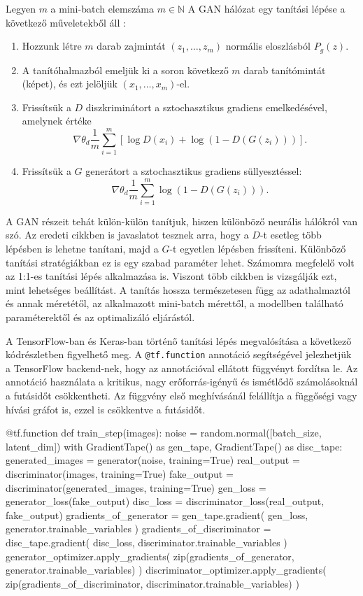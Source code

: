 Legyen $m$ a mini-batch elemszáma $m \in \mathbb{N}$
A GAN hálózat egy tanítási lépése a következő műveletekből áll \cite{goodfellow2014generative}:
\begin{enumerate}
\item Hozzunk létre $m$ darab zajmintát $(z_1, \ldots, z_m)$ normális eloszlásból $P_g(z)$.
\item A tanítóhalmazból emeljük ki a soron következő $m$ darab tanítómintát (képet), és ezt jelöljük $(x_1, \ldots, x_m)$-el. %
\item Frissítsük a $D$ diszkriminátort a sztochasztikus gradiens emelkedésével, amelynek értéke
$$ \nabla \theta_d \frac{1}{m} \sum_{i=1}^{m} \left[\log D(x_i) + \log(1 - D(G(z_i))) \right].$$
\item  Frissítsük a $G$ generátort a sztochasztikus gradiens süllyesztéssel:
$$ \nabla \theta_d \frac{1}{m} \sum_{i=1}^{m} \log(1 - D(G(z_i))).$$
\end{enumerate}

A GAN részeit tehát külön-külön tanítjuk, hiszen különböző neurális hálókról van szó. Az eredeti cikkben is javaslatot tesznek arra, hogy a $D$-t esetleg több lépésben is lehetne tanítani, majd a $G$-t egyetlen lépésben frissíteni.
Különböző tanítási stratégiákban ez is egy szabad paraméter lehet. Számomra megfelelő volt az 1:1-es tanítási lépés alkalmazása is. Viszont több cikkben is vizsgálják ezt, mint lehetséges beállítást.
A tanítás hossza természetesen függ az adathalmaztól és annak méretétől, az alkalmazott mini-batch mérettől, a modellben található paraméterektől és az optimalizáló eljárástól.

A TensorFlow-ban és Keras-ban történő tanítási lépés megvalósítása a következő kódrészletben figyelhető meg. A \texttt{@tf.function} annotáció segítségével jelezhetjük a TensorFlow backend-nek, hogy az annotációval ellátott függvényt fordítsa le. Az annotáció használata a kritikus, nagy erőforrás-igényű és ismétlődő számolásoknál a futásidőt csökkentheti. Az függvény első meghívásánál felállítja a függőségi vagy hívási gráfot is, ezzel is csökkentve a futásidőt.

\begin{python}
@tf.function
def train_step(images):
    noise = random.normal([batch_size, latent_dim])
    with GradientTape() as gen_tape, GradientTape() as disc_tape:
        generated_images = generator(noise, training=True)
        real_output = discriminator(images, training=True)
        fake_output = discriminator(generated_images, training=True)
        gen_loss = generator_loss(fake_output)
        disc_loss = discriminator_loss(real_output, fake_output)
    gradients_of_generator = gen_tape.gradient(
        gen_loss, generator.trainable_variables
    )
    gradients_of_discriminator = disc_tape.gradient(
        disc_loss, discriminator.trainable_variables
    )
    generator_optimizer.apply_gradients(
        zip(gradients_of_generator,
        generator.trainable_variables)
    )
    discriminator_optimizer.apply_gradients(
        zip(gradients_of_discriminator,
        discriminator.trainable_variables)
    )
\end{python}

